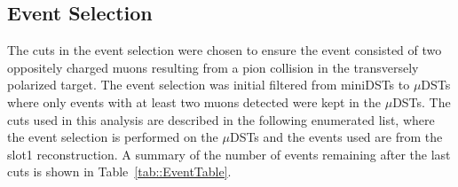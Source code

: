 \subsection{Event Selection} \label{sec::dy_eventselection}
The cuts in the event selection were chosen to ensure the event consisted of two
oppositely charged muons resulting from a pion collision in the transversely
polarized target.  The event selection was initial filtered from miniDSTs to
$\mu$DSTs where only events with at least two muons detected were kept in the
$\mu$DSTs.  The cuts used in this analysis are described in the following
enumerated list, where the event selection is performed on the $\mu$DSTs and the
events used are from the slot1 reconstruction.  A summary of the number of
events remaining after the last cuts is shown in Table~\ref{tab::EventTable}.


